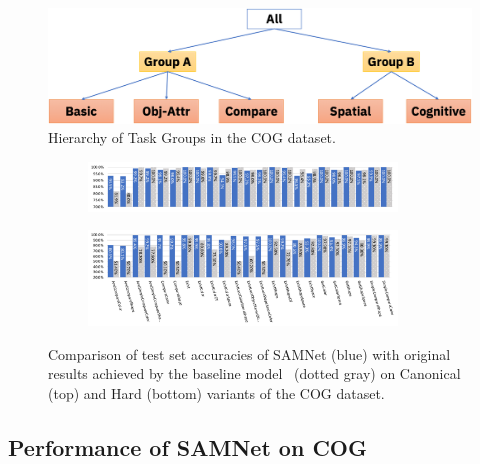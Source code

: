 \begin{figure}[htbp]
	\centering
	\includegraphics[width=\columnwidth]{../img/architecture/hierarchy}
	\caption{Hierarchy of Task Groups in the COG dataset.}
	\label{fig:task-groups}
\end{figure}

\begin{figure}[htbp]
	\centering
	\begin{subfigure}{\textwidth}
		\centering
		\includegraphics[width=0.9\textwidth]{../results/samnet_cog_orig_canonical_no_labels.pdf}
	\end{subfigure}%
	\newline
	\begin{subfigure}{\textwidth}
		\centering
		\includegraphics[width=0.9\textwidth]{../results/samnet_cog_orig_hard.pdf}
	\end{subfigure}%
	\caption{Comparison of test set accuracies of SAMNet (blue) with original results achieved by the baseline model~\cite{yang2018dataset} (dotted gray) on Canonical (top) and Hard (bottom) variants of the COG dataset.}
	\label{fig:samnet_cog_detailed}
\end{figure}


\subsection{Performance of SAMNet on COG}
\label{sec:cog-baseline-compare}



